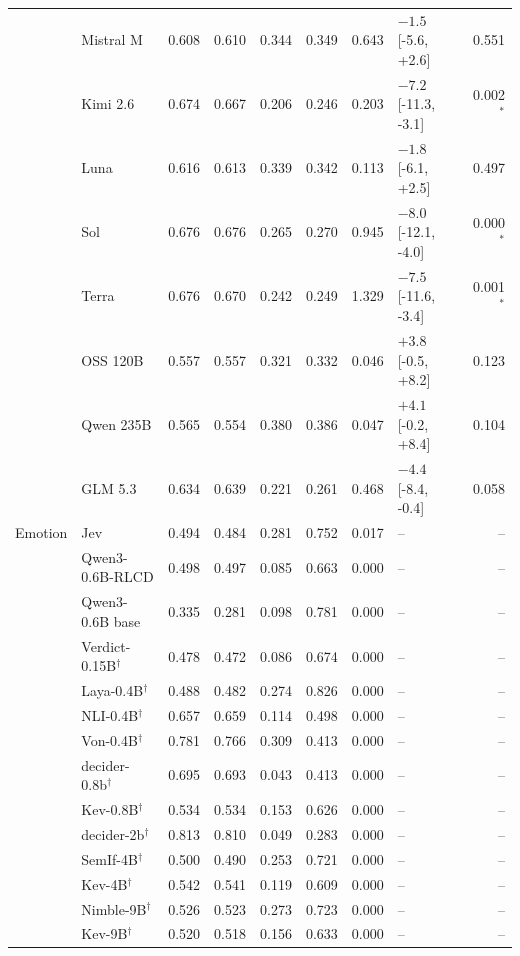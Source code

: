 \begin{longtable}{llrrrrrlr}
 & Mistral M & 0.608 & 0.610 & 0.344 & 0.349 & 0.643 & $-1.5$ [-5.6, +2.6] & 0.551 \\
 & Kimi 2.6 & 0.674 & 0.667 & 0.206 & 0.246 & 0.203 & $-7.2$ [-11.3, -3.1] & 0.002$^{*}$ \\
 & Luna & 0.616 & 0.613 & 0.339 & 0.342 & 0.113 & $-1.8$ [-6.1, +2.5] & 0.497 \\
 & Sol & 0.676 & 0.676 & 0.265 & 0.270 & 0.945 & $-8.0$ [-12.1, -4.0] & 0.000$^{*}$ \\
 & Terra & 0.676 & 0.670 & 0.242 & 0.249 & 1.329 & $-7.5$ [-11.6, -3.4] & 0.001$^{*}$ \\
 & OSS 120B & 0.557 & 0.557 & 0.321 & 0.332 & 0.046 & $+3.8$ [-0.5, +8.2] & 0.123 \\
 & Qwen 235B & 0.565 & 0.554 & 0.380 & 0.386 & 0.047 & $+4.1$ [-0.2, +8.4] & 0.104 \\
 & GLM 5.3 & 0.634 & 0.639 & 0.221 & 0.261 & 0.468 & $-4.4$ [-8.4, -0.4] & 0.058 \\
\midrule
Emotion & Jev & 0.494 & 0.484 & 0.281 & 0.752 & 0.017 & -- & -- \\
 & Qwen3-0.6B-RLCD & 0.498 & 0.497 & 0.085 & 0.663 & 0.000 & -- & -- \\
 & Qwen3-0.6B base & 0.335 & 0.281 & 0.098 & 0.781 & 0.000 & -- & -- \\
 & Verdict-0.15B$^{\dagger}$ & 0.478 & 0.472 & 0.086 & 0.674 & 0.000 & -- & -- \\
 & Laya-0.4B$^{\dagger}$ & 0.488 & 0.482 & 0.274 & 0.826 & 0.000 & -- & -- \\
 & NLI-0.4B$^{\dagger}$ & 0.657 & 0.659 & 0.114 & 0.498 & 0.000 & -- & -- \\
 & Von-0.4B$^{\dagger}$ & 0.781 & 0.766 & 0.309 & 0.413 & 0.000 & -- & -- \\
 & decider-0.8b$^{\dagger}$ & 0.695 & 0.693 & 0.043 & 0.413 & 0.000 & -- & -- \\
 & Kev-0.8B$^{\dagger}$ & 0.534 & 0.534 & 0.153 & 0.626 & 0.000 & -- & -- \\
 & decider-2b$^{\dagger}$ & 0.813 & 0.810 & 0.049 & 0.283 & 0.000 & -- & -- \\
 & SemIf-4B$^{\dagger}$ & 0.500 & 0.490 & 0.253 & 0.721 & 0.000 & -- & -- \\
 & Kev-4B$^{\dagger}$ & 0.542 & 0.541 & 0.119 & 0.609 & 0.000 & -- & -- \\
 & Nimble-9B$^{\dagger}$ & 0.526 & 0.523 & 0.273 & 0.723 & 0.000 & -- & -- \\
 & Kev-9B$^{\dagger}$ & 0.520 & 0.518 & 0.156 & 0.633 & 0.000 & -- & -- \\

\end{longtable}
